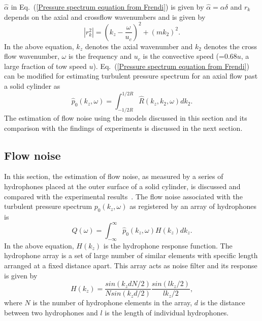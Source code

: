 \documentclass[twocolumn,10pt]{asme2ej}
\begin{document}
$\hat{\alpha}$ in Eq.~(\ref{Pressure spectrum equation from Frendi}) is given by $\hat{\alpha} = \alpha\delta$ and $r_{k}$ depends on the axial and crossflow wavenumbers and is given by 
\begin{equation}\label{rk equation}
    |{r_{k}^{2}}| = (k_{z} - \frac{\omega}{u_{c}})^{2} + (mk_{2})^{2}.
\end{equation}
In the above equation, $k_{z}$ denotes the axial wavenumber and $k_{2}$ denotes the cross flow wavenumber, $\omega$ is the frequency and $u_{c}$ is the convective speed (=0.68$u$, a large fraction of tow speed $u$). Eq.~(\ref{Pressure spectrum equation from Frendi}) can be modified for estimating turbulent pressure spectrum for an axial flow past a solid cylinder as
\begin{equation}\label{One D equation Frendi}
    \hat{p}_0(k_{z},\omega) = \int_{-1/2R}^{1/2R}\hat{R}(k_{z},k_{2},\omega)dk_{2}.
\end{equation}
The estimation of flow noise using the models discussed in this section and its comparison with the findings of experiments is discussed in the next section.

\subsection{Flow noise} \label{sec:flownoise}
In this section, the estimation of flow noise, as measured by a series of hydrophones placed at the outer surface of a solid cylinder, is discussed and compared with the experimental results~\cite{Unni2011}.
The flow noise associated with the turbulent pressure spectrum $p_{0}(k_{z},\omega)$ as registered by an array of hydrophones~\cite{Unni2011} is 
\begin{equation}\label{Flow noise equaton from Unni}
    Q(\omega) = \int_{-\infty}^{\infty} \hat{p}_{0}(k_{z},\omega)H(k_{z})dk_{z}.
\end{equation}
In the above equation, $H(k_{z})$ is the hydrophone response function. The hydrophone array is a set of large number of similar elements with specific length arranged at a fixed distance apart. This array acts as noise filter and its response is given by \cite{Unni2011} 
\begin{equation}\label{Hydrophone response equation from Unni}
    H(k_{z}) = \frac{sin(k_{z}dN/2)}{Nsin(k_{z}d/2)}\frac{sin(lk_{z}/2)}{lk_{z}/2},
\end{equation}
where $N$ is the number of hydrophone elements in the array, $d$ is the distance between two hydrophones and $l$ is the length of individual hydrophones.
\end{document}
